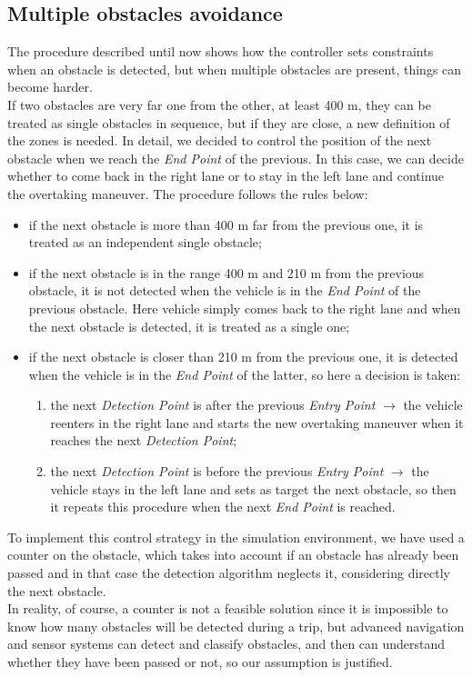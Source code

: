 \subsection{Multiple obstacles avoidance}
The procedure described until now shows how the controller sets constraints when an obstacle is detected, but when multiple obstacles are present, things can become harder.\\
If two obstacles are very far one from the other, at least 400 m, they can be treated as single obstacles in sequence, but if they are close, a new definition of the zones is needed. In detail, we decided to control the position of the next obstacle when we reach the \textit{End Point} of the previous. In this case, we can decide whether to come back in the right lane or to stay in the left lane and continue the overtaking maneuver. The procedure follows the rules below:
\begin{itemize}
    \item if the next obstacle is more than 400 m far from the previous one, it is treated as an independent single obstacle;
    \item if the next obstacle is in the range 400 m and 210 m  from the previous obstacle, it is not detected when the vehicle is in the \textit{End Point} of the previous obstacle. Here vehicle simply comes back to the right lane and when the next obstacle is detected, it is treated as a single one;
    \item if the next obstacle is closer than 210 m from the previous one, it is detected when the vehicle is in the \textit{End Point} of the latter, so here a decision is taken:
    \begin{enumerate}
        \item the next \textit{Detection Point} is after the previous \textit{Entry Point} $\xrightarrow{}$ the vehicle reenters in the right lane and starts the new overtaking maneuver when it reaches the next \textit{Detection Point};
        \item the next \textit{Detection Point} is before the previous \textit{Entry Point} $\xrightarrow{}$ the vehicle stays in the left lane and sets as target the next obstacle, so then it repeats this procedure when the next \textit{End Point} is reached.
    \end{enumerate}
\end{itemize}
To implement this control strategy in the simulation environment, we have used a counter on the obstacle, which takes into account if an obstacle has already been passed and in that case the detection algorithm neglects it, considering directly the next obstacle.\\
In reality, of course, a counter is not a feasible solution since it is impossible to know how many obstacles will be detected during a trip, but advanced navigation and sensor systems can detect and classify obstacles, and then can understand whether they have been passed or not, so our assumption is justified.

